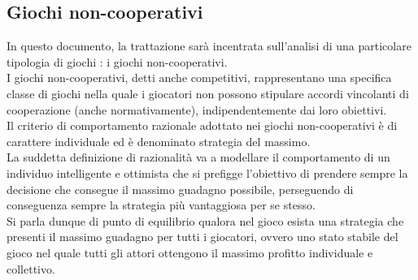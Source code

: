 \begin{flushleft}
\subsection{Giochi non-cooperativi}
In questo documento, la trattazione sarà incentrata sull'analisi di una particolare tipologia di giochi : i giochi non-cooperativi.\\
I giochi non-cooperativi, detti anche competitivi, rappresentano una specifica classe di giochi nella quale i giocatori non possono stipulare accordi vincolanti di cooperazione (anche normativamente), indipendentemente dai loro obiettivi.\\
Il criterio di comportamento razionale adottato nei giochi non-cooperativi è di carattere individuale ed è denominato strategia del massimo.\\
La suddetta definizione di razionalità va a modellare il comportamento di un individuo intelligente e ottimista che si prefigge l'obiettivo di prendere sempre la decisione che consegue il massimo guadagno possibile, perseguendo di conseguenza sempre la strategia più vantaggiosa per se stesso.\\
Si parla dunque di punto di equilibrio qualora nel gioco esista una strategia che presenti il massimo guadagno per tutti i giocatori, ovvero uno stato stabile del gioco nel quale tutti gli attori ottengono il massimo profitto individuale e collettivo.\newline


\end{flushleft}
